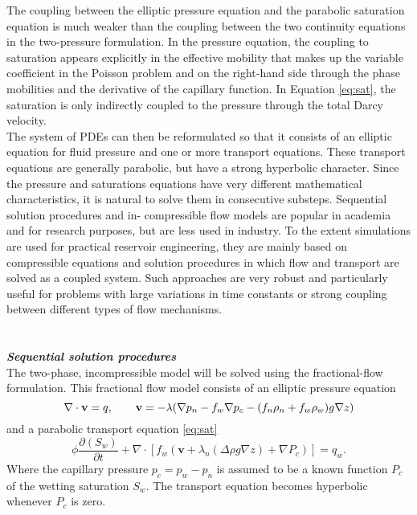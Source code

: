 \documentclass[a4paper,10pt]{report}
\begin{document}
The coupling between the elliptic pressure equation and the parabolic saturation equation is much weaker than the coupling between the two continuity
equations in the two-pressure formulation. In the pressure equation,
the coupling to saturation appears explicitly in the effective mobility that makes up the variable coefficient in the Poisson problem and on the
right-hand side through the phase mobilities and the derivative of the capillary function. In Equation \eqref{eq:sat}, the saturation is only indirectly
coupled to the pressure through the total Darcy velocity. \\
The system of PDEs can then be reformulated so that
it consists of an elliptic equation for fluid pressure and one or more transport equations. These transport equations are generally parabolic, but have a
strong hyperbolic character. Since the pressure and saturations equations have very different mathematical characteristics, it is natural
to solve them in consecutive substeps. Sequential solution procedures and in-
compressible flow models are popular in academia and for research purposes,
but are less used in industry. To the extent simulations are used for practical reservoir engineering, they are mainly based on compressible equations
and solution procedures in which flow and transport are solved as a coupled
system. Such approaches are very robust and particularly useful for problems
with large variations in time constants or strong coupling between different
types of flow mechanisms. \\\\\\
\emph{\textbf{Sequential solution procedures}}\\
The two-phase, incompressible model will be solved using the fractional-flow formulation. This fractional flow model consists of an elliptic
pressure equation
\begin{equation}\label{eq:wdarcy}
 \nabla \cdot \mathbf{v}=q, \qquad \mathbf{v}=-\lambda(\nabla p_n-f_w\nabla p_c-(f_n \rho_n+f_w\rho_w)g\nabla z)\\
\end{equation}
and a parabolic transport equation \eqref{eq:sat}
\begin{equation}\label{eq:wsat}
 \phi\frac{\partial( {S}_{w})}{\partial t}+\nabla \cdot [f_w( \mathbf{v}+\lambda_n(\Delta  \rho g\nabla z)+\nabla P_c)]= q_w.
\end{equation}
Where the capillary pressure $p_c = p_w −p_n$ is assumed to be a known function $P_c$ of the wetting saturation $S_w$. The transport equation becomes hyperbolic whenever $P_c$ is zero.\\
\end{document}
